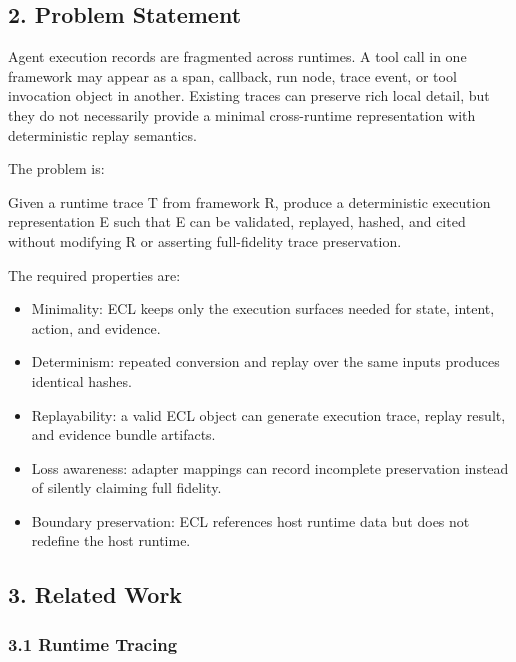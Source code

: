 \documentclass[
]{article}
\newenvironment{Shaded}{}{}
\newcommand{\NormalTok}[1]{#1}
\providecommand{\tightlist}{%
  \setlength{\itemsep}{0pt}\setlength{\parskip}{0pt}}
\begin{document}
\subsection{2. Problem Statement}\label{problem-statement}

Agent execution records are fragmented across runtimes. A tool call in
one framework may appear as a span, callback, run node, trace event, or
tool invocation object in another. Existing traces can preserve rich
local detail, but they do not necessarily provide a minimal
cross-runtime representation with deterministic replay semantics.

The problem is:

\begin{Shaded}
\begin{Highlighting}[]
\NormalTok{Given a runtime trace T from framework R,}
\NormalTok{produce a deterministic execution representation E}
\NormalTok{such that E can be validated, replayed, hashed, and cited}
\NormalTok{without modifying R or asserting full{-}fidelity trace preservation.}
\end{Highlighting}
\end{Shaded}

The required properties are:

\begin{itemize}
\tightlist
\item
  Minimality: ECL keeps only the execution surfaces needed for state,
  intent, action, and evidence.
\item
  Determinism: repeated conversion and replay over the same inputs
  produces identical hashes.
\item
  Replayability: a valid ECL object can generate execution trace, replay
  result, and evidence bundle artifacts.
\item
  Loss awareness: adapter mappings can record incomplete preservation
  instead of silently claiming full fidelity.
\item
  Boundary preservation: ECL references host runtime data but does not
  redefine the host runtime.
\end{itemize}

\subsection{3. Related Work}\label{related-work}

\subsubsection{3.1 Runtime Tracing}\label{runtime-tracing}
\end{document}
